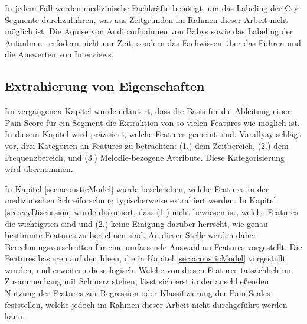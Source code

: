 In jedem Fall werden medizinische Fachkräfte benötigt, um das Labeling der Cry-Segmente durchzuführen, was aus Zeitgründen im Rahmen dieser Arbeit nicht möglich ist. Die Aquise von Audioaufnahmen von Babys sowie das Labeling der Aufanhmen erfodern nicht nur Zeit, sondern das Fachwissen über das Führen und die Auswerten von Interviews.

\subsection{Extrahierung von Eigenschaften}
\label{sec:segmentFeatures}

Im vergangenen Kapitel wurde erläutert, dass die Basis für die Ableitung einer Pain-Score für ein Segment die Extraktion von \glqq so vielen Features wie möglich\grqq{} ist. In diesem Kapitel wird präzisiert, welche Features gemeint sind.  Varallyay \cite[S. 16 - 17]{cry_thesis} schlägt vor, drei Kategorien an Features zu betrachten: (1.) dem Zeitbereich, (2.) dem Frequenzbereich, und (3.) Melodie-bezogene Attribute. Diese Kategorisierung wird übernommen.

In Kapitel \ref{sec:acousticModel} wurde beschrieben, welche Features in der medizinischen Schreiforschung typischerweise extrahiert werden. In Kapitel \ref{sec:cryDiscussion} wurde diskutiert, dass (1.) nicht bewiesen ist, welche Features die \glqq wichtigsten\grqq{} sind und (2.) keine Einigung darüber herrscht, wie genau bestimmte Features zu berechnen sind. An dieser Stelle werden daher Berechnungsvorschriften für eine umfassende Auswahl an Features vorgestellt. Die Features basieren auf den Ideen, die in Kapitel \ref{sec:acousticModel} vorgestellt wurden, und erweitern diese logisch. Welche von diesen Features tatsächlich im Zusammenhang mit Schmerz stehen, lässt sich erst in der anschließenden Nutzung der Features zur Regression oder Klassifizierung der Pain-Scales feststellen, welche jedoch im Rahmen dieser Arbeit nicht durchgeführt werden kann.

